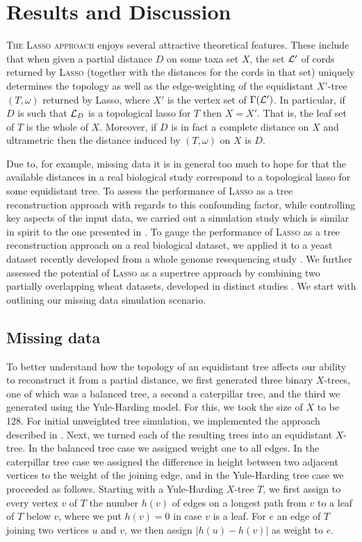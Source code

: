 \section{Results and Discussion}
\label{sec:results}

\textsc{The Lasso approach} enjoys several attractive theoretical
features. These include that when given a partial distance $D$ on some taxa
set $X$, the set ${\mathcal L}'$ of cords returned by \textsc{Lasso} (together with the
distances for the cords in that set) uniquely determines the topology as well
as the edge-weighting of the equidistant $X'$-tree $(T,\omega)$ returned by
{\sc Lasso}, where $X'$ is the vertex set of $\Gamma({\mathcal L}')$.  In particular,
if $D$ is such that ${\mathcal L}_D$ is a topological lasso for $T$ then $X=X'$.  That
is, the leaf set of $T$ is the whole of $X$.  Moreover, if $D$ is in fact a
complete distance on $X$ and ultrametric then the distance induced by
$(T,\omega)$ on $X$ is $D$.

Due to, for example, missing data it is in general too much to hope for that
the available distances in a real biological study correspond to a topological
lasso for some equidistant tree. To assess the performance of \textsc{Lasso}
as a tree reconstruction approach with regards to this confounding factor,
while controlling key aspects of the input data, we carried out a simulation
study which is similar in spirit to the one presented in
\cite{criscuolo2008fastnj}.  To gauge the performance of \textsc{Lasso} as a
tree reconstruction approach on a real biological dataset, we applied it to a
yeast dataset \cite{west14ribosomal} recently developed from a whole genome
resequencing study \cite{liti}. We further assessed the potential of
\textsc{Lasso} as a supertree approach by combining two partially overlapping
wheat datasets, developed in distinct studies \cite{gediflux, muge}.  We start
with outlining our missing data simulation scenario.

\subsection{Missing data}
\label{sec:missing-data-disc}

To better understand how the topology of an equidistant tree affects our
ability to reconstruct it from a partial distance, we first generated three
binary $X$-trees, one of which was a balanced tree, a second a caterpillar
tree, and the third we generated using the Yule-Harding model. For this, we
took the size of $X$ to be 128.  For initial unweighted tree simulation, we
implemented the approach described in \cite[Section
2.5]{semple2003phylogenetics}.  Next, we turned each of the resulting trees
into an equidistant $X$-tree. In the balanced tree case we assigned weight one
to all edges. In the caterpillar tree case we assigned the difference in
height between two adjacent vertices to the weight of the joining edge, and in
the Yule-Harding tree case we proceeded as follows. Starting with a
Yule-Harding $X$-tree $T$, we first assign to every vertex $v$ of $T$ the
number $h(v)$ of edges on a longest path from $v$ to a leaf of $T$ below $v$,
where we put $h(v)=0$ in case $v$ is a leaf.  For $e$ an edge of $T$ joining
two vertices $u$ and $v$, we then assign $|h(u)-h(v)|$ as weight to $e$.

